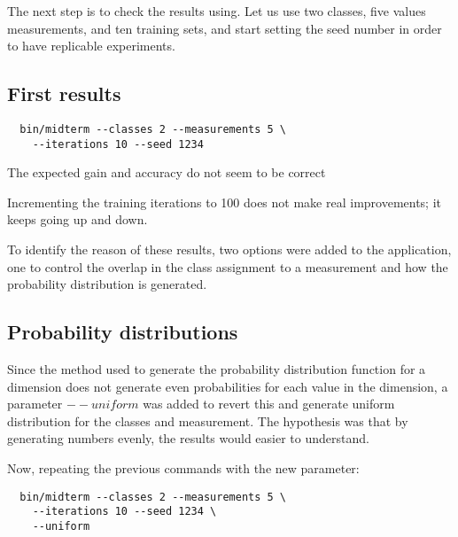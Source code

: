 \documentclass[letterpaper, conference]{IEEEtran}
\begin{document}
The next step is to check the results using. Let us use two classes, five values measurements, and ten training sets, and start setting the seed number in order to have replicable experiments.

\subsection{First results}

\begin{verbatim}
  bin/midterm --classes 2 --measurements 5 \
    --iterations 10 --seed 1234
\end{verbatim}

The expected gain and accuracy do not seem to be correct

\begin{figure}[hbt]
  \label{fig:10-training-2-classes}
  \caption{}
\end{figure}

Incrementing the training iterations to 100 does not make real improvements; it keeps going up and down.

\begin{figure}[hbt]
  \label{fig:100-training-2-classes}
  \caption{}
\end{figure}

To identify the reason of these results, two options were added to the application, one to control the overlap in the class assignment to a measurement and how the probability distribution is generated.

\subsection{Probability distributions}

Since the method used to generate the probability distribution function for a dimension does not generate even probabilities for each value in the dimension, a parameter $--uniform$ was added to revert this and generate uniform distribution for the classes and measurement. The hypothesis was that by generating numbers evenly, the results would easier to understand.

Now, repeating the previous commands with the new parameter:

\begin{verbatim}
  bin/midterm --classes 2 --measurements 5 \
    --iterations 10 --seed 1234 \
    --uniform
\end{verbatim}

\begin{figure}[hbt]
  \label{fig:10-training-2-classes-uniform}
  \caption{}
\end{figure}
\end{document}

